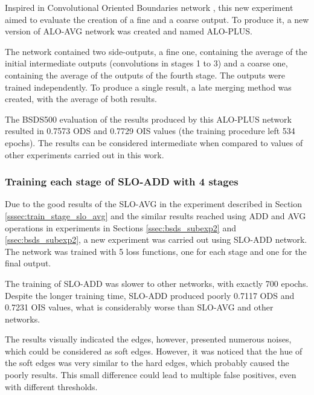Inspired in Convolutional Oriented Boundaries network \cite{COB:2016}, this new experiment aimed to evaluate the creation of a fine and a coarse output.
To produce it, a new version of ALO-AVG network was created and named ALO-PLUS.

The network contained two side-outputs, a fine one, containing the average of the initial intermediate outputs (convolutions in stages 1 to 3) and a coarse one, containing the average of the outputs of the fourth stage.
The outputs were trained independently.
To produce a single result, a late merging method was created, with the average of both results.

The BSDS500 evaluation of the results produced by this ALO-PLUS network resulted in 0.7573 ODS and 0.7729 OIS values (the training procedure left 534 epochs).
The results can be considered intermediate when compared to values of other experiments carried out in this work.


\subsubsection{Training each stage of SLO-ADD  with 4 stages}
\label{sssec:train_stage_slo_add}

Due to the good results of the SLO-AVG in the experiment described in Section \ref{sssec:train_stage_slo_avg} and the similar results reached using ADD and AVG operations in experiments in Sections \ref{ssec:bsds_subexp2} and \ref{ssec:bsds_subexp2}, a new experiment was carried out using SLO-ADD network.
The network was trained with 5 loss functions, one for each stage and one for the final output.

The training of SLO-ADD was slower to other networks, with exactly 700 epochs.
Despite the longer training time, SLO-ADD produced poorly 0.7117 ODS and 0.7231 OIS values, what is considerably worse than SLO-AVG and other networks.

The results visually indicated the edges, however, presented numerous noises, which could be considered as soft edges.
However, it was noticed that the hue of the soft edges was very similar to the hard edges, which probably caused the poorly results.
This small difference could lead to multiple false positives, even with different thresholds.

